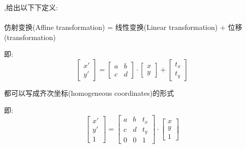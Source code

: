 \documentclass[UTF8]{ctexbook}
\begin{document}
{{{{        {,给出以下下定义:}\\\\\indent
        仿射变换(Affine transformation) = 线性变换(Linear transformation) + 位移(transformation)

        即:
        $$\left[\begin{array}{c}
              x\prime \\
              y\prime
            \end{array}\right]
          =
          \left[\begin{matrix}
              a & b \\
              c & d
            \end{matrix}\right]
          \cdot
          \left[\begin{array}{c}
              x \\
              y
            \end{array}\right]
          +
          \left[\begin{array}{c}
              t_x \\
              t_y
            \end{array}\right]$$

        都可以写成齐次坐标(homogeneous coordinates)的形式

        即:
        $$\left[\begin{array}{c}
              x\prime \\
              y\prime \\
              1
            \end{array}\right]
          =
          \left[\begin{matrix}
              a & b & t_x \\
              c & d & t_y \\
              0 & 0 & 1
            \end{matrix}\right]
          \cdot
          \left[\begin{array}{c}
              x \\
              y \\
              1
            \end{array}\right]$$

}}}}
\end{document}
